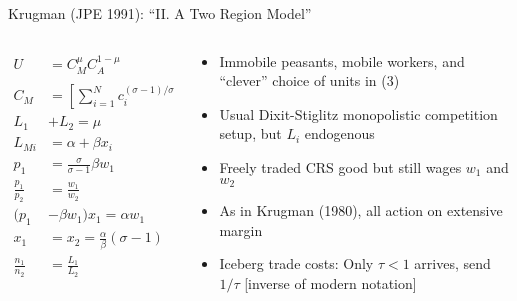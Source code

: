 \documentclass[10pt,notes=hide]{beamer}
\begin{document}
\begin{frame}{Krugman (JPE 1991): ``II. A Two Region Model''}
\begin{columns}
\begin{column}{.5\textwidth}
\begin{align*}
U 
&=
C_M^{\mu}C_A^{1-\mu}
&
\text{(1)}
\\
C_M 
&=
\left[\sum_{i=1}^{N} c_i^{(\sigma-1)/\sigma}\right]^{\sigma/(\sigma-1)}
&
\text{(2)}
\\
L_1 &+ L_2 
=
\mu
&
\text{(3)}
\\
L_{Mi} 
&= 
\alpha + \beta x_i
&
\text{(4)}
\\
p_1 
&=
\frac{\sigma}{\sigma-1} \beta w_1
&
\text{(5)}
\\
\frac{p_1}{p_2}
&=
\frac{w_1}{w_2}  
&
\text{(6)}
\\
(p_1 &- \beta w_1) x_1 
=
\alpha w_1
&
\text{(7)}
\\
x_1 &= x_2 = \frac{\alpha}{\beta} (\sigma-1)
&
\text{(8)}
\\
\frac{n_1}{n_2} &= \frac{L_1}{L_2}
&
\text{(9)}
\end{align*}
\end{column}
\begin{column}{.48\textwidth}
\begin{itemize}
	\item Immobile peasants, mobile workers, and ``clever'' choice of units in (3)
	\item Usual Dixit-Stiglitz monopolistic competition setup, but $L_i$ endogenous
	\item Freely traded CRS good but still wages $w_1$ and $w_2$
	\item As in Krugman (1980), all action on extensive margin
	\item Iceberg trade costs: Only $\tau<1$ arrives, send $1/\tau$ [inverse of modern notation]
\end{itemize}
\end{column}
\end{columns}
\end{frame}
\end{document}
